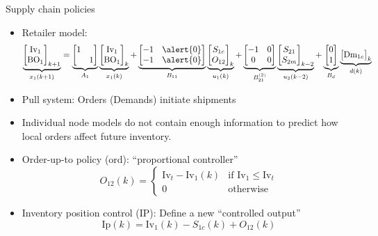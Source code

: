 \documentclass[table]{beamer}
\newcommand{\BO}{\textrm{BO}}
\newcommand{\IP}{\textrm{Ip}}
\newcommand{\Inv}{\textrm{Iv}}
\newcommand{\Dem}{\textrm{Dm}}
\begin{document}
\begin{frame}{Supply chain policies}
\begin{itemize}
\item \alert{Retailer model:}
{\tiny{\begin{equation*}
\underbrace{\begin{bmatrix}\Inv_1\\\BO_1\end{bmatrix}_{k+1}}_{x_1(k+1)} =
\underbrace{\begin{bmatrix}1&\\ &
    1\end{bmatrix}}_{A_1}\underbrace{\begin{bmatrix}\Inv_1\\\BO_1\end{bmatrix}_k}_{x_1(k)}
+\underbrace{\begin{bmatrix}-1 & \alert{0} \\-1&
    \alert{0} \end{bmatrix}}_{B_{11}}\underbrace{\begin{bmatrix}S_{1c}\\O_{12}\end{bmatrix}_k}_{u_1(k)}
+\underbrace{\begin{bmatrix}-1 & 0 \\0&
    0 \end{bmatrix}}_{B_{21}^{(2)}}\underbrace{\begin{bmatrix}S_{21}\\S_{2m}\end{bmatrix}_{k-2}}_{u_2(k-2)}
+\underbrace{\begin{bmatrix} 0\\1\end{bmatrix}}_{B_d}\underbrace{\begin{bmatrix}\Dem_{1c}\end{bmatrix}_{k}}_{d(k)}
\end{equation*}
}}
\item \alert{Pull system}: Orders (Demands) initiate shipments  
 \item Individual node models do not contain enough information to
   predict how local orders affect future inventory.
   \newline
{}  
  \item \alert{Order-up-to policy (ord):} ``proportional controller''
   \begin{equation*}
      O_{12}(k) = \begin{cases} \Inv_t-\Inv_1(k) & \text{if $\Inv_1 \leq \Inv_t$} \\
             0 & \text{otherwise}  \end{cases}
   \end{equation*}
  \item \alert{Inventory position control (IP):} Define a new ``controlled output''
   \begin{equation*}
    \IP(k) = \Inv_1(k)-S_{1c}(k) + O_{12}(k)
   \end{equation*}
 \end{itemize}
 

\end{frame}
\end{document}
